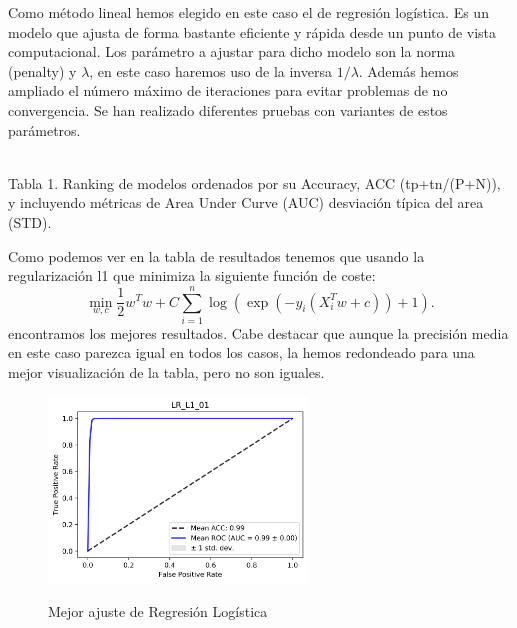 \documentclass{article}
\begin{document}
Como método lineal hemos elegido en este caso el de regresión logística. Es un modelo que ajusta de forma bastante eficiente y rápida desde un punto de vista computacional. 
Los parámetro a ajustar para dicho modelo son la norma (penalty) y \(\lambda\), en este caso haremos uso de la inversa \(1/\lambda\). Además hemos ampliado el número máximo de iteraciones para evitar problemas de no convergencia.
Se han realizado diferentes pruebas con variantes de estos parámetros.
\begin{table}[H]
\centering
{}
  \footnotesize{~\\ Tabla 1. Ranking de modelos ordenados por su Accuracy, ACC (tp+tn/(P+N)), y incluyendo métricas de Area Under Curve (AUC) desviación típica del area (STD).}
\end{table}

Como podemos ver en la tabla de resultados tenemos que usando la regularización l1 que minimiza la siguiente función de coste:
\[\min_{w, c} \frac{1}{2}w^T w + C \sum_{i=1}^n \log(\exp(- y_i (X_i^T w + c)) + 1) .\]
encontramos los mejores resultados. Cabe destacar que aunque la precisión media en este caso parezca igual en todos los casos, la hemos redondeado para una mejor visualización de la tabla, pero no son iguales.

\begin{figure}[H]
\centering
\includegraphics[width=260px]{figures/LR_L1_01_roc}
\label{fig:figure}
\caption{Mejor ajuste de Regresión Logística}
\end{figure}
\end{document}
